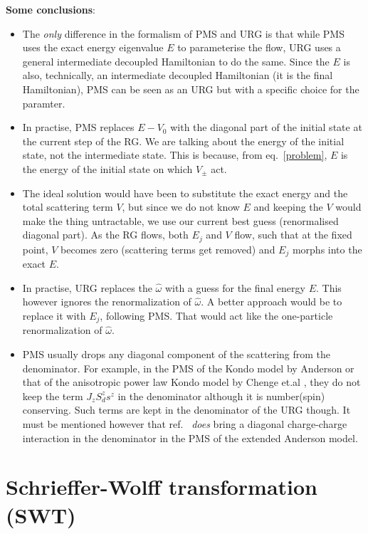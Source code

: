 \textbf{Some conclusions}:
\begin{itemize}
\item The \textit{only} difference in the formalism of PMS and URG is that while PMS uses the exact energy eigenvalue \(E\) to parameterise the flow, URG uses a general intermediate decoupled Hamiltonian to do the same. Since the \(E\) is also, technically, an intermediate decoupled Hamiltonian (it is the final Hamiltonian), PMS can be seen as an URG but with a specific choice for the paramter.
\item In practise, PMS replaces \(E-V_0\) with the diagonal part of the initial state at the current step of the RG. We are talking about the energy of the initial state, not the intermediate state. This is because, from eq.~\ref{problem}, \(E\) is the energy of the initial state on which \(V_\pm\) act. 
\item The ideal solution would have been to substitute the exact energy and the total scattering term \(V\), but since we do not know \(E\) and keeping the \(V\) would make the thing untractable, we use our current best guess (renormalised diagonal part). As the RG flows, both \(E_j\) and \(V\) flow, such that at the fixed point, \(V\) becomes zero (scattering terms get removed) and \(E_j\) morphs into the exact \(E\). 
\item In practise, URG replaces the \(\hat \omega\) with a guess for the final energy \(E\). This however ignores the renormalization of \(\hat \omega\). A better approach would be to replace it with \(E_j\), following PMS. That would act like the one-particle renormalization of \(\hat \omega\).
\item PMS usually drops any diagonal component of the scattering from the denominator. For example, in the PMS of the Kondo model by Anderson \cite{anderson1970} or that of the anisotropic power law Kondo model by Chenge et.al \cite{tatha}, they do not keep the term \(J_z S_d^z s^z\) in the denominator although it is number(spin) conserving. Such terms are kept in the denominator of the URG though. It must be mentioned however that ref.~\cite{raja} \textit{does} bring a diagonal charge-charge interaction in the denominator in the PMS of the extended Anderson model.
\end{itemize}
\section{Schrieffer-Wolff transformation (SWT)}\label{sc_wl_t}
